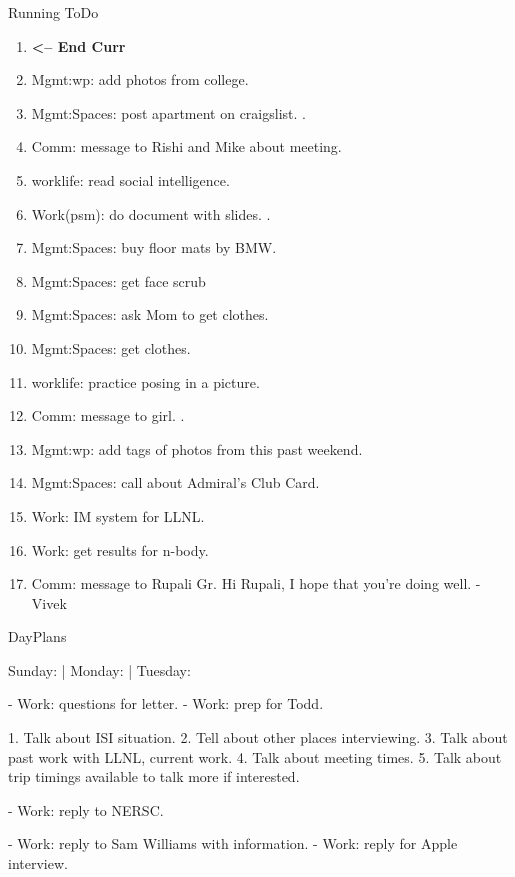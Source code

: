 \begin{columns}
\begin{column}{0.6\linewidth}
\begin{block}{Running ToDo}
\begin{enumerate}
      \item \tiny \textbf{ <-- End Curr }
      \item \tiny Mgmt:wp: add photos from college.           
      \item \tiny Mgmt:Spaces: post apartment on craigslist. .
      \item \tiny Comm: message to Rishi and Mike about meeting. 
      \item \tiny worklife: read social intelligence.  
      \item \tiny Work(psm): do document with slides. .
      \item \tiny Mgmt:Spaces: buy floor mats by BMW. 
      \item \tiny Mgmt:Spaces: get face scrub
      \item \tiny Mgmt:Spaces: ask Mom to get clothes.
      \item \tiny Mgmt:Spaces: get clothes. 
      \item \tiny worklife: practice posing in a picture.  
      \item \tiny Comm: message to girl.  . 
      \item \tiny Mgmt:wp: add tags of photos from this past weekend.  
      \item \tiny Mgmt:Spaces: call about Admiral's Club Card.
      \item \tiny Work: IM system for LLNL. 
      \item \tiny Work: get results for n-body. 
      \item \tiny Comm: message to Rupali Gr. 
        Hi Rupali, I hope that you're doing well. -Vivek


      \end{enumerate}
    \end{block} 


\begin{block}{DayPlans} 

  Sunday:   
  | Monday: 
  | Tuesday: 

  - Work: questions for letter. 
  - Work: prep for Todd. 

1. Talk about ISI situation.
2. Tell about other places interviewing. 
3. Talk about past work with LLNL, current work. 
4. Talk about meeting times. 
5. Talk about trip timings available to talk more if interested. 


  - Work: reply to NERSC. 

  - Work: reply to Sam Williams with information. 
  - Work: reply for Apple interview.


\end{block}
\end{column}
\end{columns}
